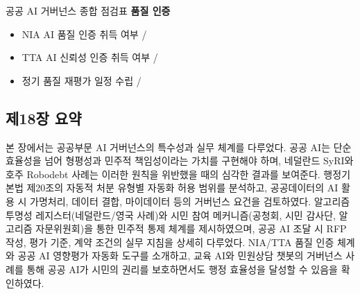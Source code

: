 \begin{practicaltool}{공공 AI 거버넌스 종합 점검표}
\textbf{품질 인증}
\begin{itemize}
    \item NIA AI 품질 인증 취득 여부 \checkmark / \texttimes
    \item TTA AI 신뢰성 인증 취득 여부 \checkmark / \texttimes
    \item 정기 품질 재평가 일정 수립 \checkmark / \texttimes
\end{itemize}
\end{practicaltool}

\subsection*{제18장 요약}

본 장에서는 공공부문 AI 거버넌스의 특수성과 실무 체계를 다루었다. 공공 AI는 단순 효율성을 넘어 형평성과 민주적 책임성이라는 가치를 구현해야 하며, 네덜란드 SyRI와 호주 Robodebt 사례는 이러한 원칙을 위반했을 때의 심각한 결과를 보여준다. 행정기본법 제20조의 자동적 처분 유형별 자동화 허용 범위를 분석하고, 공공데이터의 AI 활용 시 가명처리, 데이터 결합, 마이데이터 등의 거버넌스 요건을 검토하였다. 알고리즘 투명성 레지스터(네덜란드/영국 사례)와 시민 참여 메커니즘(공청회, 시민 감사단, 알고리즘 자문위원회)을 통한 민주적 통제 체계를 제시하였으며, 공공 AI 조달 시 RFP 작성, 평가 기준, 계약 조건의 실무 지침을 상세히 다루었다. NIA/TTA 품질 인증 체계와 공공 AI 영향평가 자동화 도구를 소개하고, 교육 AI와 민원상담 챗봇의 거버넌스 사례를 통해 공공 AI가 시민의 권리를 보호하면서도 행정 효율성을 달성할 수 있음을 확인하였다.
